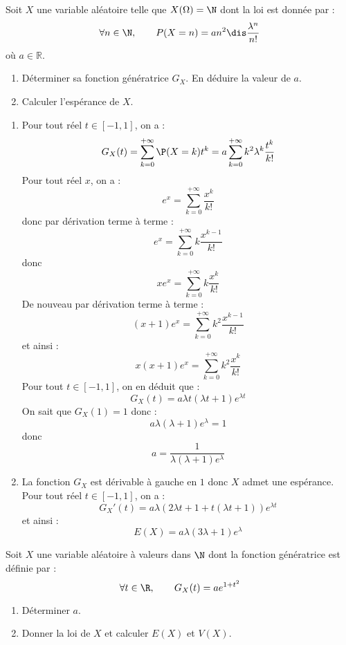 \documentclass[a4paper,10pt]{report}
\begin{document}
\begin{Exercice}{} Soit $X$ une variable al\'eatoire telle que $X(\Omega)=\N$ dont la loi est donnée par :
$$\forall n\in\N,\qquad P(X=n)=an^2\dis\frac{\lambda^n}{n!}$$
où $a \in \mathbb{R}$.
\begin{enumerate}
	\item D\'eterminer sa fonction g\'en\'eratrice $G_X.$ En d\'eduire la valeur de $a.$
	
	\item Calculer l'esp\'erance de $X.$
\end{enumerate}
\end{Exercice}

\corr 

\begin{enumerate}
\item Pour tout réel $t \in [-1,1]$, on a :
$$ G_X(t) = \sum_{k=0}^{+ \infty} \P(X=k) t^k = a  \sum_{k=0}^{+ \infty} k^2 \lambda^k \dfrac{t^k}{k!} $$  
Pour tout réel $x$, on a :
$$ e^x = \sum_{k=0}^{+ \infty} \dfrac{x^k}{k!}$$
donc par dérivation terme à terme :
$$ e^x =  \sum_{k=0}^{+ \infty} k\dfrac{x^{k-1}}{k!}$$
donc
$$ x e^x =  \sum_{k=0}^{+ \infty} k\dfrac{x^{k}}{k!}$$
De nouveau par dérivation terme à terme :
$$ (x+1)e^x =  \sum_{k=0}^{+ \infty} k^2\dfrac{x^{k-1}}{k!}$$
et ainsi :
$$ x(x+1) e^x =  \sum_{k=0}^{+ \infty} k^2\dfrac{x^{k}}{k!}$$
Pour tout $t \in [-1,1]$, on en déduit que :
$$ G_X(t) = a \lambda t (\lambda t +1) e^{\lambda t}$$
On sait que $G_X(1)=1$ donc :
$$ a \lambda (\lambda + 1) e^{\lambda} = 1$$
donc
$$ a = \dfrac{1}{\lambda (\lambda+1) e^{\lambda}}$$
\item La fonction $G_X$ est dérivable à gauche en $1$ donc $X$ admet une espérance. Pour tout réel $t \in [-1,1]$, on a :
$$ G_X'(t) = a\lambda ( 2\lambda t+1 +  t (\lambda t + 1)) e^{\lambda t}$$
et ainsi :
$$ E(X) = a \lambda (3 \lambda +1 ) e^{\lambda}$$
\end{enumerate}


\begin{Exercice}{} Soit $X$ une variable al\'eatoire \`a valeurs dans $\N$ dont la fonction g\'en\'eratrice est définie par :
$$\forall t\in\R,\qquad G_X(t)=ae^{1+t^2}$$

\begin{enumerate}
	\item D\'eterminer $a.$
	
	\item Donner la loi de $X$ et calculer $E(X)$ et $V(X).$
	
\end{enumerate}
\end{Exercice}
\end{document}
